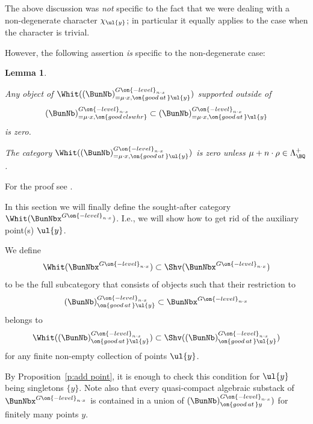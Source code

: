 \documentclass[9pt]{amsart}
\newtheorem{lem}[subsubsection]{Lemma}
\theoremstyle{definition}
\theoremstyle{remark}
\newcommand{\propref}[1]{Proposition~\ref{#1}}
\numberwithin{equation}{section}
\begin{document}
The above discussion was \emph{not} specific to the fact that we were dealing with a non-degenerate character 
$\chi_{\ul{y}}$; in particular it equally applies to the case when the character is trivial. 

\medskip

However, the following assertion \emph{is} specific to the non-degenerate case:

\begin{lem} \label{l:good strata y} \hfill

\smallskip

Any object of $\Whit((\BunNb)^{G\on{-level}_{n\cdot x}}_{=\mu\cdot x,\on{good\,at\,}\ul{y}})$ supported outside of 
$$(\BunNb)^{G\on{-level}_{n\cdot x}}_{=\mu\cdot x,\on{good\,elswhr}}
\subset (\BunNb)^{G\on{-level}_{n\cdot x}}_{=\mu\cdot x,\on{good\,at\,}\ul{y}}$$
is zero.

\smallskip

The category $\Whit((\BunNb)^{G\on{-level}_{n\cdot x}}_{=\mu\cdot x,\on{good\,at\,}\ul{y}})$ is zero
unless $\mu+n\cdot \rho\in \Lambda^+_\BQ$.

\end{lem}

For the proof see \cite[Lemma 6.2.4]{FGV}.


In this section we will finally define the sought-after category $\Whit(\BunNbx^{G\on{-level}_{n\cdot x}})$. I.e.,
we will show how to get rid of the auxiliary point(s) $\ul{y}$.  

\sssec{}

We define
$$\Whit(\BunNbx^{G\on{-level}_{n\cdot x}})\subset \Shv(\BunNbx^{G\on{-level}_{n\cdot x}})$$
to be the full subcategory that consists of objects such that their restriction to
$$(\BunNb)^{G\on{-level}_{n\cdot x}}_{\on{good\,at\,}\ul{y}}\subset \BunNbx^{G\on{-level}_{n\cdot x}}$$
belongs to
$$\Whit((\BunNb)^{G\on{-level}_{n\cdot x}}_{\on{good\,at\,}\ul{y}})\subset
\Shv((\BunNb)^{G\on{-level}_{n\cdot x}}_{\on{good\,at\,}\ul{y}})$$
for any finite non-empty collection of points $\ul{y}$.

\medskip

By \propref{p:add point}, it is enough to check this condition for $\ul{y}$ being singletons $\{y\}$. Note also that every quasi-compact 
algebraic substack of $\BunNbx^{G\on{-level}_{n\cdot x}}$ is contained in a union of 
$(\BunNb)^{G\on{-level}_{n\cdot x}}_{\on{good\,at\,}y})$ for finitely many points $y$.
\end{document}
